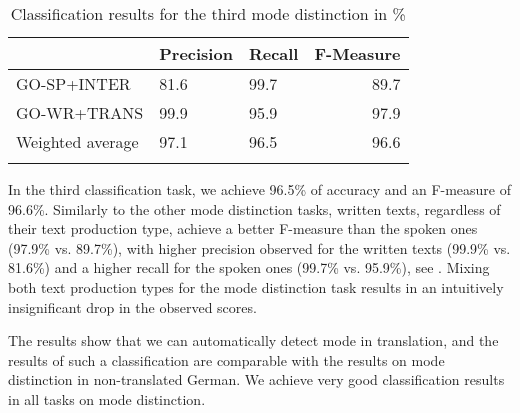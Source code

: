 \documentclass[output=paper,colorlinks,citecolor=brown]{langscibook}
\begin{document}
\begin{table}[t]
    \begin{tabularx}{\textwidth}{XYYr}
    \lsptoprule
 &\bf Precision & \bf Recall & \bf F-Measure\\
 \midrule
GO-SP+INTER &   81.6  & 99.7  & 89.7   \\
GO-WR+TRANS &   99.9   & 95.9  & 97.9    \\
Weighted average &  97.1  &   96.5   &  96.6  \\
\lspbottomrule
    \end{tabularx}
    \caption{Classification results for the third mode distinction in \%}
    \label{tab:rq2-3}
\end{table}

In the third classification task, we achieve 96.5\% of accuracy and an F-measure of 96.6\%. %
Similarly to the other mode distinction tasks, written texts, regardless of their text production type, achieve a better F-measure than the spoken ones (97.9\% vs. 89.7\%), with  higher precision observed for the written texts (99.9\% vs. 81.6\%) and a higher recall for the spoken ones (99.7\% vs. 95.9\%), see . Mixing both text production types for the mode distinction task results in an intuitively insignificant %
drop in the observed scores.

The results show that we can automatically detect mode in translation, and the results of such a classification are comparable with the results on mode distinction in non-translated German. We achieve very good classification results in all tasks on mode distinction.

 
\end{document}
